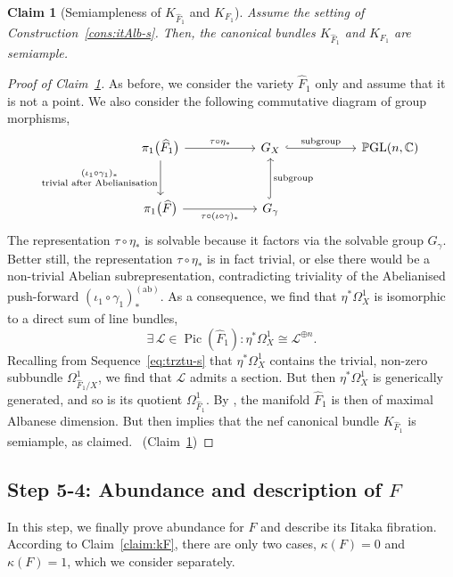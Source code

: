 \documentclass[JEP,XML,SOM,Unicode,published]{cedram}
\let\scr\mathscr
\let\ts\relax
\newcommand{\ab}{\mathrm{ab}}
\theoremstyle{plain}
\newtheorem{claim}[thm]{Claim}
\theoremstyle{definition}
\numberwithin{equation}{thm}
\numberwithin{enumi}{thm}
\DeclareMathOperator{\Pic}{Pic}
\DeclareMathOperator{\GL}{GL}
\DeclareMathOperator{\PGL}{\bP\negthinspace\GL}
\newcommand{\sL}{\scr{L}}
\newcommand{\bC}{\mathbb{C}}
\newcommand{\bP}{\mathbb{P}}
\let\what\widehat
\begin{document}
\begin{claim}[Semiampleness of $K_{\what{F}_1}$ and $K_{F_1}$]\label{claim:6-25a-s}
Assume the setting of Construction~\ref{cons:itAlb-s}. Then, the canonical
bundles $K_{\what{F}_1}$ and $K_{F_1}$ are semiample.
\end{claim}
\begin{proof}[Proof of Claim~\ref{claim:6-25a-s}]
As before, we consider the variety $\what{F}_1$ only and assume that it is not
a point. We also consider the following commutative diagram of group
morphisms,
\[
\begin{tikzcd}[column sep=2cm, row sep=1cm]
\pi_1\bigl(\what{F}_1 \bigr) \ar[r, "\ts\tau\circ \eta_*"] \ar[d, "\underset{\scriptstyle\text{trivial after Abelianisation}}{\ts(\iota_1\circ \gamma_1)_*}"'] & G_X \ar[r, hook, "\ts\text{subgroup}"] & \PGL(n,\bC) \\
\pi_1\bigl(\what{F} \bigr) \ar[r, "\ts\tau\circ (\iota\circ \gamma)_*"'] & G_\gamma \ar[u, hook, "\ts\text{subgroup}"']
\end{tikzcd}
\]
The representation $\tau\circ \eta_*$ is solvable because it factors via the solvable
group $G_\gamma$. Better still, the representation $\tau\circ \eta_*$ is in fact trivial, or
else there would be a non-trivial Abelian subrepresentation, contradicting
triviality of the Abelianised push-forward $(\iota_1\circ \gamma_1)^{(\ab)}_*$. As a
consequence, we find that $\eta^* \Omega^1_X$ is isomorphic to a direct sum of line
bundles,
\[
\exists\, \sL \in \Pic(\what{F}_1) : \eta^* \Omega^1_X \cong \sL^{\oplus n}.
\]
Recalling from Sequence~\eqref{eq:trztu-s} that $\eta^* \Omega^1_X$ contains the
trivial, non-zero subbundle $\Omega^1_{\what{F}_1/X}$, we find that $\sL$ admits a
section. But then $\eta^* \Omega^1_X$ is generically generated, and so is its quotient
$\Omega^1_{\what{F}_1}$. By \cite[Rem.~2.2]{Fuj13}, the manifold $\what{F}_1$ is
then of maximal Albanese dimension. But then \cite[Th.\,4.2]{Fuj13} implies
that the nef canonical bundle $K_{\what{F}_1}$ is semiample, as claimed.
\qedhere~\mbox{(Claim~\ref{claim:6-25a-s})}
\end{proof}

\subsection*{Step 5-4: Abundance and description of $F$}

In this step, we finally prove abundance for $F$ and describe its Iitaka
fibration. According to Claim~\ref{claim:kF}, there are only two cases,
$\kappa(F) = 0$ and $\kappa(F) = 1$, which we consider separately.
\end{document}
